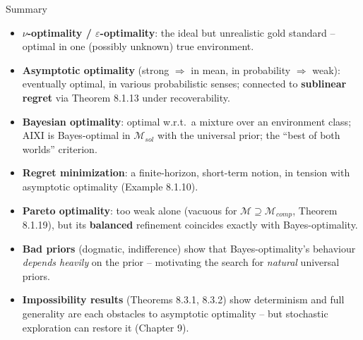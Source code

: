 \documentclass[aspectratio=169,10pt]{beamer}
\newcommand{\Msol}{\mathcal{M}_{sol}}
\newcommand{\Mcomp}{\mathcal{M}_{comp}}
\begin{document}
\begin{frame}{Summary}
  \begin{itemize}
    \item \textbf{$\nu$-optimality / $\varepsilon$-optimality}: the ideal
      but unrealistic gold standard -- optimal in one (possibly unknown)
      true environment.
    \item \textbf{Asymptotic optimality} (strong $\Rightarrow$ in mean, in
      probability $\Rightarrow$ weak): eventually optimal, in various
      probabilistic senses; connected to \textbf{sublinear regret} via
      Theorem 8.1.13 under recoverability.
    \item \textbf{Bayesian optimality}: optimal w.r.t.\ a mixture over an
      environment class; AIXI is Bayes-optimal in $\Msol$ with the
      universal prior; the ``best of both worlds'' criterion.
    \item \textbf{Regret minimization}: a finite-horizon, short-term
      notion, in tension with asymptotic optimality (Example 8.1.10).
    \item \textbf{Pareto optimality}: too weak alone (vacuous for
      $\mathcal{M}\supseteq\Mcomp$, Theorem 8.1.19), but its
      \textbf{balanced} refinement coincides exactly with Bayes-optimality.
    \item \textbf{Bad priors} (dogmatic, indifference) show that
      Bayes-optimality's behaviour \emph{depends heavily} on the prior --
      motivating the search for \emph{natural} universal priors.
    \item \textbf{Impossibility results} (Theorems 8.3.1, 8.3.2) show
      determinism and full generality are each obstacles to asymptotic
      optimality -- but stochastic exploration can restore it (Chapter 9).
  \end{itemize}
\end{frame}
\end{document}
